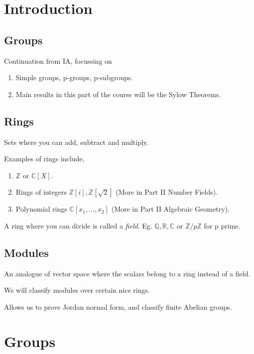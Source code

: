 \section*{Introduction}
\subsection{Groups}
Continuation from IA, focussing on
\begin{enumerate}
    \item Simple groups, p-groups, p-subgroups.
    \item Main results in this part of the course will be the Sylow Theorems.
\end{enumerate}
\subsection{Rings}
Sets where you can add, subtract and multiply.

\begin{eg}
    Examples of rings include,
    \begin{enumerate}
        \item \(\mathbb{Z}\) or \(\mathbb{C}[X]\).
        \item Rings of integers \(\mathbb{Z}[i], \mathbb{Z}[\sqrt{2} ]\)  (More in Part II Number Fields).
        \item Polynomial rings \(\mathbb{C}[x_1, \ldots , x_2 ]\) (More in Part II Algebraic Geometry).
    \end{enumerate}
\end{eg}

A ring where you can divide is called a \textit{field}.
Eg. \(\mathbb{Q},\mathbb{R},\mathbb{C}\) or \(\mathbb{Z} / p\mathbb{Z}\) for p prime.

\subsection{Modules}
An analogue of vector space where the scalars belong to a ring instead of a field.

We will classify modules over certain nice rings.

Allows us to prove Jordan normal form, and classify finite Abelian groups.

\section{Groups}
